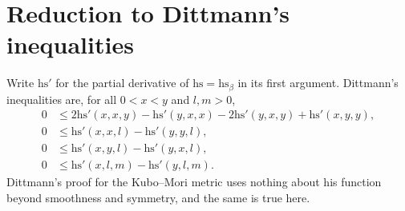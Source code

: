 \documentclass[11pt]{amsart}
\theoremstyle{definition}
\numberwithin{equation}{section}
\newcommand{\hs}{\mathrm{hs}}
\begin{document}
\section{Reduction to Dittmann's inequalities}

Write $\hs'$ for the partial derivative of $\hs=\hs_\beta$ in its first argument. Dittmann's inequalities are, for all $0<x<y$ and $l,m>0$,
\begin{align}
0&\le 2\hs'(x,x,y)-\hs'(y,x,x)-2\hs'(y,x,y)+\hs'(x,y,y),\tag{62}\label{62}\\
0&\le \hs'(x,x,l)-\hs'(y,y,l),\tag{63}\label{63}\\
0&\le \hs'(x,y,l)-\hs'(y,x,l),\tag{64}\label{64}\\
0&\le \hs'(x,l,m)-\hs'(y,l,m).\tag{65}\label{65}
\end{align}
Dittmann's proof for the Kubo--Mori metric uses nothing about his function beyond smoothness and symmetry, and the same is true here.
\end{document}
